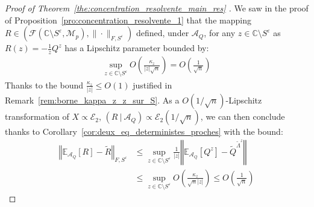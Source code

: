 \documentclass[a4papaer, titlepage]{book}
\begin{document}
\begin{proof}[Proof of Theorem~\ref{the:concentration_resolvente_main_res} ]
  We saw in the proof of Proposition~\ref{pro:concentration_resolvente_1} that the mapping $R \in (\mathcal F(\mathbb C \setminus S^\varepsilon, \mathcal M_p), \|\cdot \|_{F,S^\varepsilon}) $ defined, under $\mathcal A_Q$, for any $z \in \mathbb C \setminus S^\varepsilon$ as $R(z) = -\frac{1}{z} Q^z$ has a Lipschitz parameter bounded by:
  \begin{align*}
     \sup_{z \in \mathbb C \setminus S^\varepsilon}O \left(\frac{\kappa_z}{|z|\sqrt n}  \right) = O \left(\frac{1}{\sqrt n}\right)
   \end{align*}
   Thanks to the bound $\frac{\kappa_z}{|z|} \leq O(1)$ justified in Remark~\ref{rem:borne_kappa_z_z_sur_S}.
   As a $O(1/\sqrt n)$-Lipschitz transformation of $X\propto \mathcal E_2$, $(R \ | \ \mathcal A_Q) \propto \mathcal E_2(1/\sqrt n)$, we can then conclude thanks to Corollary~\ref{cor:deux_eq_deterministes_proches} with the bound:
   \begin{align*}
     \left\Vert \mathbb E_{\mathcal A_Q}[R] - \tilde R\right\Vert_{F, S^\varepsilon} 
     &\leq \sup_{z \in \mathbb C \setminus S^\varepsilon} \frac{1}{|z|} \left\Vert \mathbb{E}_{\mathcal A_Q} \left[Q^z\right] - \tilde Q^{\tilde \Lambda^z} \right\Vert \\
     &\leq \sup_{z \in \mathbb C \setminus S^\varepsilon} O \left(\frac{\kappa_z}{\sqrt n|z|}\right) \leq O \left(\frac{1}{\sqrt n}\right)
   \end{align*}
\end{proof}
\end{document}
